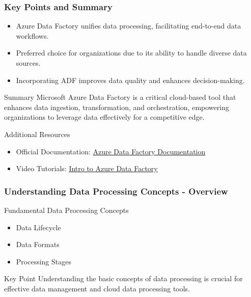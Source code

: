 \documentclass[aspectratio=169]{beamer}
\begin{document}
\begin{frame}[fragile]
    \frametitle{Key Points and Summary}
    \begin{itemize}
        \item Azure Data Factory unifies data processing, facilitating end-to-end data workflows.
        \item Preferred choice for organizations due to its ability to handle diverse data sources.
        \item Incorporating ADF improves data quality and enhances decision-making.
    \end{itemize}
    
    \begin{block}{Summary}
        Microsoft Azure Data Factory is a critical cloud-based tool that enhances data ingestion, transformation, and orchestration, empowering organizations to leverage data effectively for a competitive edge.
    \end{block}
    
    \begin{block}{Additional Resources}
        \begin{itemize}
            \item Official Documentation: \href{https://docs.microsoft.com/en-us/azure/data-factory/}{Azure Data Factory Documentation}
            \item Video Tutorials: \href{https://www.youtube.com/}{Intro to Azure Data Factory}
        \end{itemize}
    \end{block}
\end{frame}

\begin{frame}[fragile]
    \frametitle{Understanding Data Processing Concepts - Overview}
    \begin{block}{Fundamental Data Processing Concepts}
        \begin{itemize}
            \item Data Lifecycle
            \item Data Formats
            \item Processing Stages
        \end{itemize}
    \end{block}
    \begin{block}{Key Point}
        Understanding the basic concepts of data processing is crucial for effective data management and cloud data processing tools.
    \end{block}
\end{frame}
\end{document}
